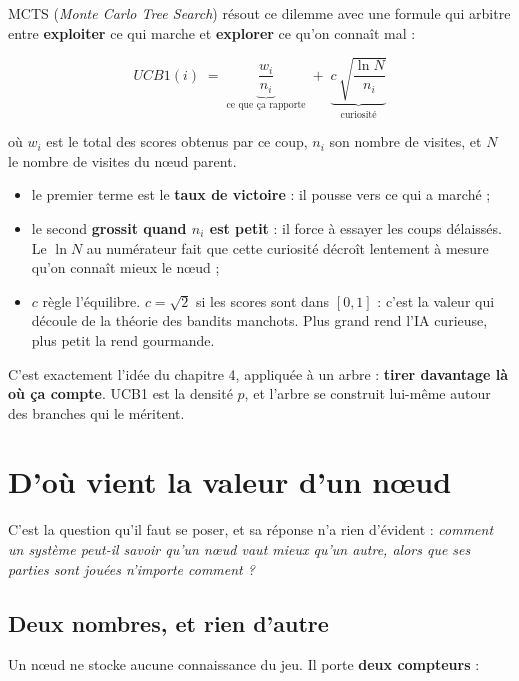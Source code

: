 MCTS (\emph{Monte Carlo Tree Search}) résout ce dilemme avec une formule qui
arbitre entre \textbf{exploiter} ce qui marche et \textbf{explorer} ce qu'on
connaît mal :

\[ UCB1(i) \;=\; \underbrace{\frac{w_i}{n_i}}_{\text{ce que ça rapporte}}
   \;+\; \underbrace{c\,\sqrt{\frac{\ln N}{n_i}}}_{\text{curiosité}} \]

où $w_i$ est le total des scores obtenus par ce coup, $n_i$ son nombre de
visites, et $N$ le nombre de visites du nœud parent.

\begin{itemize}
  \item le premier terme est le \textbf{taux de victoire} : il pousse vers ce
        qui a marché ;
  \item le second \textbf{grossit quand $n_i$ est petit} : il force à essayer
        les coups délaissés. Le $\ln N$ au numérateur fait que cette curiosité
        décroît lentement à mesure qu'on connaît mieux le nœud ;
  \item $c$ règle l'équilibre. \textbf{$c = \sqrt{2}$} si les scores sont dans
        $[0,1]$ : c'est la valeur qui découle de la théorie des bandits
        manchots. Plus grand rend l'IA curieuse, plus petit la rend gourmande.
\end{itemize}

\begin{nkretenir}
C'est exactement l'idée du chapitre 4, appliquée à un arbre : \textbf{tirer
davantage là où ça compte}. UCB1 est la densité $p$, et l'arbre se construit
lui-même autour des branches qui le méritent.
\end{nkretenir}

\section{D'où vient la valeur d'un nœud}

C'est la question qu'il faut se poser, et sa réponse n'a rien d'évident :
\emph{comment un système peut-il savoir qu'un nœud vaut mieux qu'un autre,
alors que ses parties sont jouées n'importe comment ?}

\subsection{Deux nombres, et rien d'autre}

Un nœud ne stocke aucune connaissance du jeu. Il porte \textbf{deux compteurs} :

